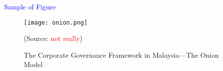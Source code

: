 \newpage
\textcolor{blue}{Sample of Figure}

\begin{figure}[h]
    \texttt{[image: onion.png]}
    \caption{The Corporate Governance Framework in Malaysia—The Onion Model}
    (Source: \textcite{abdipoor2023meta} \tiny \textcolor{red}{not really}\normalsize)
    \label{fig:onion}
\end{figure}